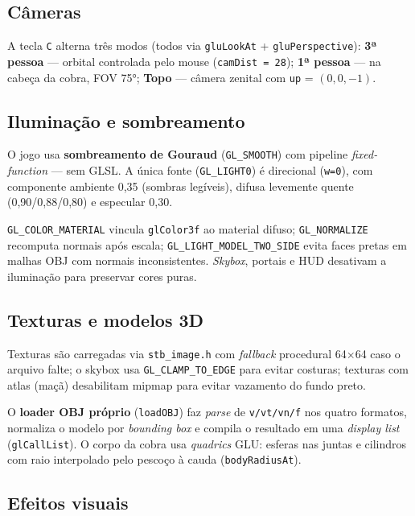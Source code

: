 \documentclass[12pt]{article}
\begin{document}
\subsection{Câmeras}

A tecla \texttt{C} alterna três modos (todos via \texttt{gluLookAt} + \texttt{gluPerspective}): \textbf{3ª pessoa} — orbital controlada pelo mouse (\texttt{camDist = 28}); \textbf{1ª pessoa} — na cabeça da cobra, FOV 75°; \textbf{Topo} — câmera zenital com \texttt{up} = $(0,0,-1)$.

\subsection{Iluminação e sombreamento}

O jogo usa \textbf{sombreamento de Gouraud} (\texttt{GL\_SMOOTH}) com pipeline \textit{fixed-function} — sem GLSL. A única fonte (\texttt{GL\_LIGHT0}) é direcional (\texttt{w=0}), com componente ambiente 0,35 (sombras legíveis), difusa levemente quente (0,90/0,88/0,80) e especular 0,30.

\texttt{GL\_COLOR\_MATERIAL} vincula \texttt{glColor3f} ao material difuso; \texttt{GL\_NORMALIZE} recomputa normais após escala; \texttt{GL\_LIGHT\_MODEL\_TWO\_SIDE} evita faces pretas em malhas OBJ com normais inconsistentes. \textit{Skybox}, portais e HUD desativam a iluminação para preservar cores puras.

\subsection{Texturas e modelos 3D}

Texturas são carregadas via \texttt{stb\_image.h} \cite{stb} com \textit{fallback} procedural 64$\times$64 caso o arquivo falte; o skybox usa \texttt{GL\_CLAMP\_TO\_EDGE} para evitar costuras; texturas com atlas (maçã) desabilitam mipmap para evitar vazamento do fundo preto.

O \textbf{loader OBJ próprio} (\texttt{loadOBJ}) faz \textit{parse} de \texttt{v/vt/vn/f} nos quatro formatos, normaliza o modelo por \textit{bounding box} e compila o resultado em uma \textit{display list} (\texttt{glCallList}). O corpo da cobra usa \textit{quadrics} GLU: esferas nas juntas e cilindros com raio interpolado pelo pescoço à cauda (\texttt{bodyRadiusAt}).

\subsection{Efeitos visuais}
\end{document}
